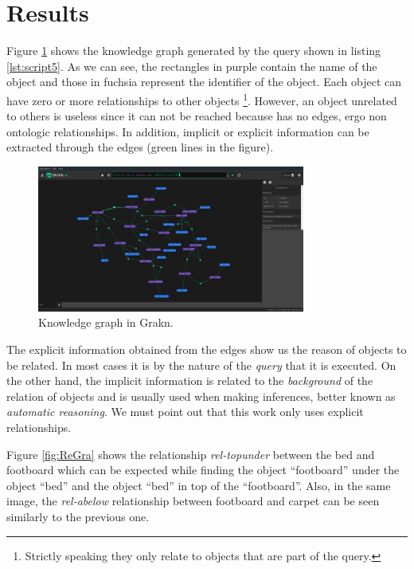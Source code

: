 \section{Results}
\label{sec:results}
Figure \ref{fig:grafGra} shows the knowledge graph generated by the query shown 
in listing \ref{lst:script5}. As we can see, the rectangles in purple 
contain the name of the object and those in fuchsia represent the identifier of 
the object. Each object can have zero or more relationships to other objects
\footnote{Strictly speaking they only relate to objects that are part of the 
query.}. However, an object unrelated to others is useless since it can
not be reached because has no edges, ergo non ontologic relationships. 
In addition, implicit or explicit information can be extracted through the 
edges (green lines in the figure).



\begin{figure}[H]
    \centering
    \includegraphics[width=8.8cm]{figures/allrel.png}
    \caption{Knowledge graph in Grakn.}
    \label{fig:grafGra}
\end{figure}

The explicit information obtained from the edges show us the reason of objects 
to be related. In most cases it is by the nature of the 
\textit{query} that it is executed. On the other hand, the implicit 
information is related to the \textit{background} of the relation of objects 
and is usually used when making inferences, better known as 
\textit{automatic reasoning}. We must point out that this work only 
uses explicit relationships.

Figure \ref{fig:ReGra} shows the relationship \textit{rel-topunder} between the 
bed and footboard which can be expected while finding the object ``footboard'' 
under the object ``bed'' and the object ``bed'' in top of the ``footboard''. 
Also, in the same image, the \textit{rel-abelow} relationship between footboard 
and carpet can be seen similarly to the previous one.

